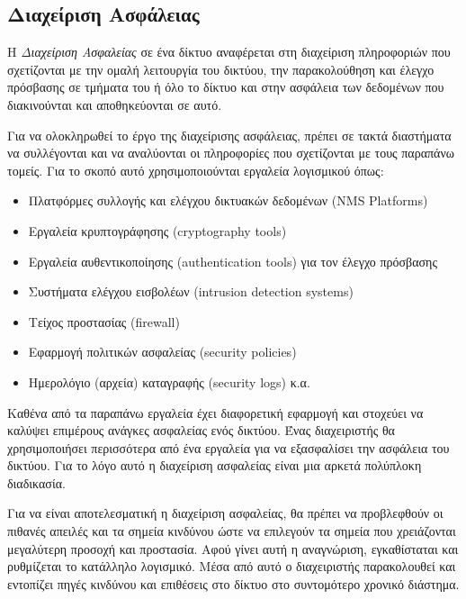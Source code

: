 %
%
\subsection{Διαχείριση Ασφάλειας}

\begin{inthebox}
Η \emph{Διαχείριση Ασφαλείας} σε ένα δίκτυο αναφέρεται στη διαχείριση πληροφοριών που σχετίζονται με την ομαλή λειτουργία του δικτύου, την παρακολούθηση και έλεγχο πρόσβασης σε τμήματα του ή όλο το δίκτυο και στην ασφάλεια των δεδομένων που διακινούνται και αποθηκεύονται σε αυτό.\\
\end{inthebox}

Για να ολοκληρωθεί το έργο της διαχείρισης ασφάλειας, πρέπει σε τακτά διαστήματα να συλλέγονται και να αναλύονται οι πληροφορίες που σχετίζονται με τους παραπάνω τομείς. Για το σκοπό αυτό χρησιμοποιούνται εργαλεία λογισμικού όπως:

\begin{itemize}
\item Πλατφόρμες συλλογής και ελέγχου δικτυακών δεδομένων (NMS Platforms)
\item Εργαλεία κρυπτογράφησης (cryptography tools)
\item Εργαλεία αυθεντικοποίησης (authentication tools) για τον έλεγχο πρόσβασης
\item Συστήματα ελέγχου εισβολέων (intrusion detection systems)
\item Τείχος προστασίας (firewall)
\item Εφαρμογή πολιτικών ασφαλείας (security policies)
\item Ημερολόγιο (αρχεία) καταγραφής (security logs) κ.α.
\end{itemize}

Καθένα από τα παραπάνω εργαλεία έχει διαφορετική εφαρμογή και στοχεύει να καλύψει επιμέρους ανάγκες ασφαλείας ενός δικτύου. Ένας διαχειριστής θα χρησιμοποιήσει περισσότερα από ένα εργαλεία για να εξασφαλίσει την ασφάλεια του δικτύου. Για το λόγο αυτό η διαχείριση ασφαλείας είναι μια αρκετά πολύπλοκη διαδικασία.

Για να είναι αποτελεσματική η διαχείριση ασφαλείας, θα πρέπει να προβλεφθούν οι πιθανές απειλές και τα σημεία κινδύνου ώστε να επιλεγούν τα σημεία που χρειάζονται μεγαλύτερη προσοχή και προστασία. Αφού γίνει αυτή η αναγνώριση, εγκαθίσταται και ρυθμίζεται το κατάλληλο λογισμικό. Μέσα από αυτό ο διαχειριστής παρακολουθεί και εντοπίζει πηγές κινδύνου και επιθέσεις στο δίκτυο στο συντομότερο χρονικό διάστημα. 